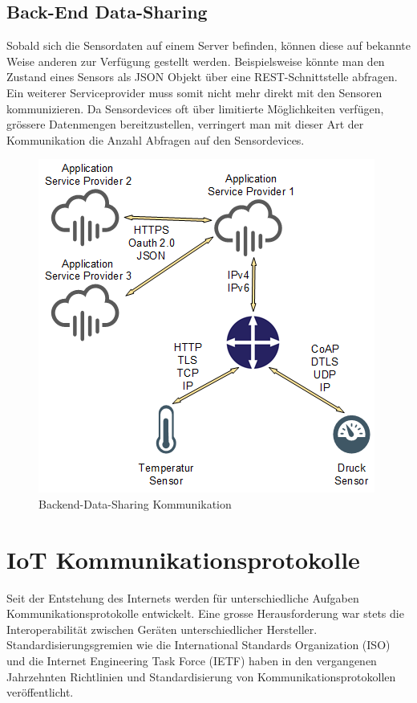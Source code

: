 \subsection{Back-End Data-Sharing}
Sobald sich die Sensordaten auf einem Server befinden, können diese auf bekannte Weise anderen zur Verfügung gestellt werden. Beispielsweise könnte man den Zustand eines Sensors als JSON Objekt über eine REST-Schnittstelle abfragen. Ein weiterer Serviceprovider muss somit nicht mehr direkt mit den Sensoren kommunizieren. Da Sensordevices oft über limitierte Möglichkeiten verfügen, grössere Datenmengen bereitzustellen, verringert man mit dieser Art der Kommunikation die Anzahl Abfragen auf den Sensordevices. 
\begin{figure}[H]
\centering
\includegraphics[scale=0.8]{../02_Analyse/images/backend-data-sharing.png}
\caption{Backend-Data-Sharing Kommunikation}
\end{figure}

\newpage

\section{IoT Kommunikationsprotokolle}
Seit der Entstehung des Internets werden für unterschiedliche Aufgaben Kommunikationsprotokolle entwickelt. Eine grosse Herausforderung war stets die Interoperabilität zwischen Geräten unterschiedlicher Hersteller. Standardisierungsgremien wie die International Standards Organization (ISO) und die Internet Engineering Task Force (IETF) haben in den vergangenen Jahrzehnten Richtlinien und Standardisierung von Kommunikationsprotokollen veröffentlicht. 

